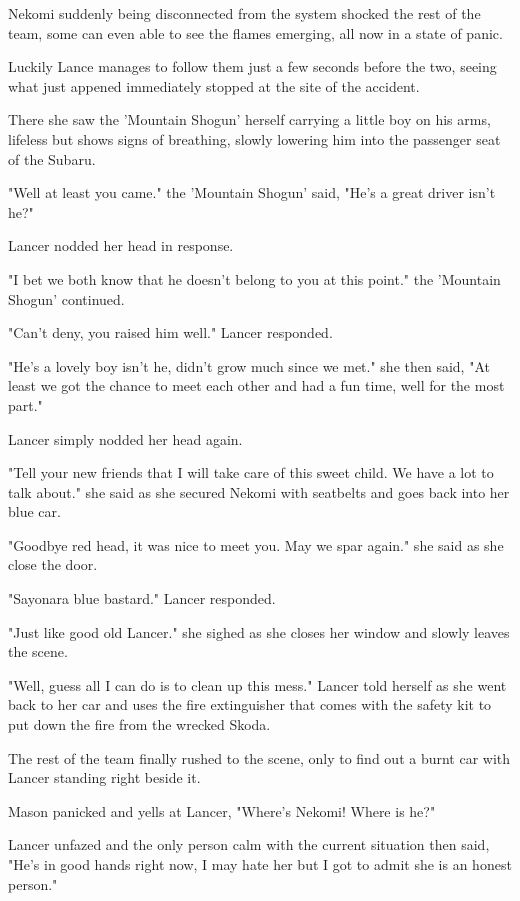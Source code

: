 Nekomi suddenly being disconnected from the system shocked the rest of the team, some can even able to see the flames emerging, all now in a state of panic.

Luckily Lance manages to follow them just a few seconds before the two, seeing what just appened immediately stopped at the site of the accident.

There she saw the 'Mountain Shogun' herself carrying a little boy on his arms, lifeless but shows signs of breathing, slowly lowering him into the passenger seat of the Subaru.

"Well at least you came." the 'Mountain Shogun' said, "He's a great driver isn't he?"

Lancer nodded her head in response.

"I bet we both know that he doesn't belong to you at this point." the 'Mountain Shogun' continued.

"Can't deny, you raised him well." Lancer responded.

"He's a lovely boy isn't he, didn't grow much since we met." she then said, "At least we got the chance to meet each other and had a fun time, well for the most part."

Lancer simply nodded her head again.

"Tell your new friends that I will take care of this sweet child. We have a lot to talk about." she said as she secured Nekomi with seatbelts and goes back into her blue car.

"Goodbye red head, it was nice to meet you. May we spar again." she said as she close the door.

"Sayonara blue bastard." Lancer responded.

"Just like good old Lancer." she sighed as she closes her window and slowly leaves the scene.

"Well, guess all I can do is to clean up this mess." Lancer told herself as she went back to her car and uses the fire extinguisher that comes with the safety kit to put down the fire from the wrecked Skoda.

The rest of the team finally rushed to the scene, only to find out a burnt car with Lancer standing right beside it.

Mason panicked and yells at Lancer, "Where's Nekomi! Where is he?"

Lancer unfazed and the only person calm with the current situation then said, "He's in good hands right now, I may hate her but I got to admit she is an honest person."

